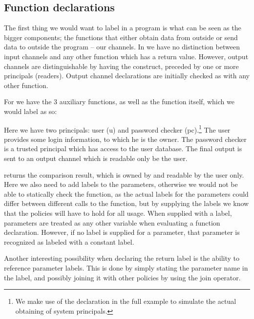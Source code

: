 \subsection{Function declarations}
The first thing we would want to label in a program is what can be seen as the bigger components; the functions that either obtain data from outside or send data to outside the program -- our channels.
In \thelang{} we have no distinction between input channels and any other function which has a return value.
However, output channels are distinguishable by having the \dlmc{<-} construct, preceded by one or more principals (readers).
Output channel declarations are initially checked as with any other function.

For  we have the 3 auxiliary functions, as well as the  function itself, which we would label as so:\\
\begin{minipage}{\linewidth}

\end{minipage}

Here we have two principals: user (u) and password checker (pc).\footnote{We make use of the  declaration in the full example to simulate the actual obtaining of system principals.}
The user provides some login information, to which he is the owner.
The password checker is a trusted principal which has access to the user database.
The final output is sent to an output channel which is readable only be the user.

 returns the comparison result, which is owned by and readable by the user only.
Here we also need to add labels to the parameters, otherwise we would not be able to statically check the function, as the actual labels for the parameters could differ between different calls to the function, but by supplying the labels we know that the policies will have to hold for all usage.
When supplied with a label, parameters are treated as any other variable when evaluating a function declaration.
However, if no label is supplied for a parameter, that parameter is recognized as labeled with a constant label.

Another interesting possibility when declaring the return label is the ability to reference parameter labels.
This is done by simply stating the parameter name in the label, and possibly joining it with other policies by using the join operator.

